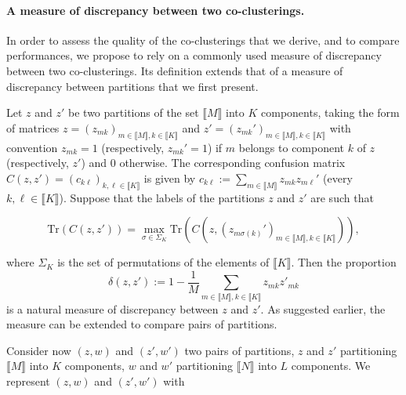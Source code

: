 \paragraph*{A measure of discrepancy between two co-clusterings.}

In order to  assess the quality of  the co-clusterings that we  derive, and to
compare  performances, we  propose  to  rely on  a  commonly  used measure  of
discrepancy  between two  co-clusterings.  Its  definition extends  that of  a
measure of discrepancy between partitions that we first present.



Let $z$  and $z'$  be two  partitions of  the set  $\llbracket M\rrbracket$ into  $K$ components,
taking    the   form    of    matrices   $z=(z_{mk})_{m\in\llbracket M\rrbracket,k\in\llbracket K\rrbracket}$    and
$z'=(z_{mk}')_{m\in\llbracket M\rrbracket,k\in\llbracket K\rrbracket}$ with  convention $z_{mk} =  1$ (respectively,
$z_{mk}' = 1$) if $m$ belongs to component $k$ of $z$ (respectively, $z'$) and
0       otherwise.        The       corresponding       confusion       matrix
$C(z,z')       =      (c_{k\ell})_{k,\ell\in\llbracket K\rrbracket}$       is      given       by
$c_{k\ell} :=  \sum_{m\in \llbracket M\rrbracket}  z_{mk} z_{m\ell}'$  (every $k,\ell  \in \llbracket K\rrbracket$).
Suppose that the labels of the partitions $z$ and $z'$ are such that

\begin{equation*}
  \text{Tr}(C(z,z'))    =     \max_{\sigma    \in     \Sigma_{K}}    \text{Tr}
  (C(z,(z_{m\sigma(k)}')_{m\in\llbracket M\rrbracket, k \in\llbracket K\rrbracket})), 
\end{equation*}

where $\Sigma_{K}$ is  the set of permutations of the  elements of $\llbracket K\rrbracket$. Then
the proportion
\begin{equation}
  \label{eq:ezz'}
  \delta(z, z') := 1 - \frac{1}{M} \sum_{m\in\llbracket M\rrbracket,k\in\llbracket K\rrbracket} z_{mk}z'_{mk}
\end{equation}
is  a natural  measure  of  discrepancy between  $z$  and  $z'$. As  suggested
earlier, the measure can be extended to compare pairs of partitions.

Consider now  $(z, w)$ and  $(z', w')$ two pairs  of partitions, $z$  and $z'$
partitioning  $\llbracket  M\rrbracket$  into  $K$ components,  $w$  and  $w'$
partitioning  $\llbracket  N\rrbracket$  into $L$  components.   We  represent
$(z,w)$                  and                   $(z',w')$                  with




